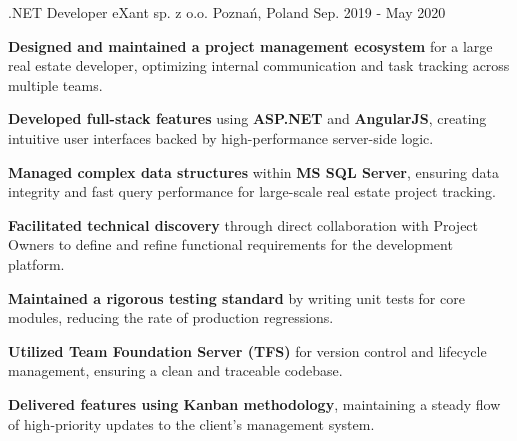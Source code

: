 \begin{cventries}
  \cventry
    {.NET Developer} %
    {eXant sp. z o.o.} %
    {Poznań, Poland} %
    {Sep. 2019 - May 2020} %
    {
      \begin{cvitems} %
        \item {\textbf{Designed and maintained a project management ecosystem} for a large real estate developer, optimizing internal communication and task tracking across multiple teams.}
        \item {\textbf{Developed full-stack features} using \textbf{ASP.NET} and \textbf{AngularJS}, creating intuitive user interfaces backed by high-performance server-side logic.}
        \item {\textbf{Managed complex data structures} within \textbf{MS SQL Server}, ensuring data integrity and fast query performance for large-scale real estate project tracking.}
        \item {\textbf{Facilitated technical discovery} through direct collaboration with Project Owners to define and refine functional requirements for the development platform.}
        \item {\textbf{Maintained a rigorous testing standard} by writing unit tests for core modules, reducing the rate of production regressions.}
        \item {\textbf{Utilized Team Foundation Server (TFS)} for version control and lifecycle management, ensuring a clean and traceable codebase.}
        \item {\textbf{Delivered features using Kanban methodology}, maintaining a steady flow of high-priority updates to the client's management system.}
      \end{cvitems}
    }


\end{cventries}

